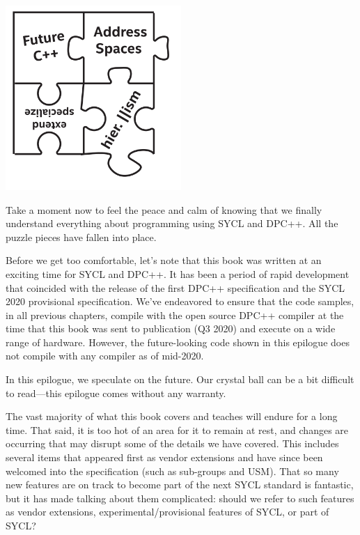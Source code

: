 \begin{center}
	\includegraphics[width=0.5\textwidth]{content/chapter-20/images/1}
\end{center}

Take a moment now to feel the peace and calm of knowing that we finally understand everything about programming using SYCL and DPC++. All the puzzle pieces have fallen into place.\par

Before we get too comfortable, let’s note that this book was written at an exciting time for SYCL and DPC++. It has been a period of rapid development that coincided with the release of the first DPC++ specification and the SYCL 2020 provisional specification. We’ve endeavored to ensure that the code samples, in all previous chapters, compile with the open source DPC++ compiler at the time that this book was sent to publication (Q3 2020) and execute on a wide range of hardware. However, the future-looking code shown in this epilogue does not compile with any compiler as of mid-2020.\par

In this epilogue, we speculate on the future. Our crystal ball can be a bit difficult to read—this epilogue comes without any warranty.\par

The vast majority of what this book covers and teaches will endure for a long time. That said, it is too hot of an area for it to remain at rest, and changes are occurring that may disrupt some of the details we have covered. This includes several items that appeared first as vendor extensions and have since been welcomed into the specification (such as sub-groups and USM). That so many new features are on track to become part of the next SYCL standard is fantastic, but it has made talking about them complicated: should we refer to such features as vendor extensions, experimental/provisional features of SYCL, or part of SYCL?\par

